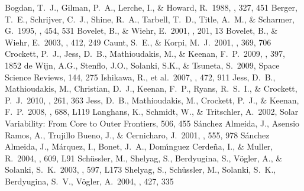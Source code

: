 \documentclass{emulateapj}
\begin{document}
\begin{thebibliography}{}
Bogdan, T.~J., Gilman, P.~A., Lerche, I., \& Howard, R.\ 1988, \apj, 327, 451 
Berger, T.~E., Schrijver, C.~J., Shine, R.~A., Tarbell, T.~D., Title, A.~M., \& Scharmer, G.\ 1995, \apj, 454, 531 
Bovelet, B., \& Wiehr, E.\ 2001, \solphys, 201, 13 
Bovelet, B., \& Wiehr, E.\ 2003, \aap, 412, 249 
Caunt, S.~E., \& Korpi, M.~J.\ 2001, \aap, 369, 706 
Crockett, P.~J., Jess, D.~B., Mathioudakis, M., \& Keenan, F.~P.\ 2009, \mnras, 397, 1852 
de Wijn, A.G., Stenflo, J.O., Solanki, S.K., \& Tsuneta, S.\ 2009, Space Science Reviews, 144,
275  
Ishikawa, R., et al.\ 2007, \aap, 472, 911
Jess, D.~B., Mathioudakis, M., Christian, D.~J., Keenan, F.~P., Ryans, R.~S.~I., \& Crockett, P.~J.\ 2010, \solphys, 261, 363 
Jess, D.~B., Mathioudakis, M., Crockett, P.~J., \& Keenan, F.~P.\ 2008, \apjl, 688, L119 
Langhans, K., Schmidt, W., \& Tritschler, A.\ 2002, Solar Variability: From Core to Outer Frontiers, 506, 455
S{\'a}nchez Almeida, J., Asensio Ramos, A., Trujillo Bueno, J., \& Cernicharo, J.\ 2001, \apj, 555, 978 
S{\'a}nchez Almeida, J., M{\'a}rquez, I., Bonet, J.~A., Dom{\'{\i}}nguez Cerde{\~n}a, I., \& Muller, R.\ 2004, \apjl, 609, L91 
Sch{\"u}ssler, M., Shelyag, S., Berdyugina, S., V{\"o}gler, A., \& Solanki, S.~K.\ 2003, \apjl, 597, L173 
Shelyag, S., Sch{\"u}ssler, M., Solanki, S.~K., Berdyugina, S.~V., V{\"o}gler, A.\ 2004, \aap, 427, 335 

\end{thebibliography}
\end{document}
